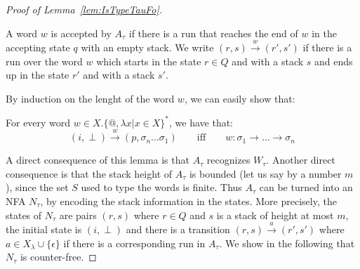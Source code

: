\begin{proof}[Proof of Lemma~\ref{lem:IsTypeTauFo}]
\begin{itemize}
\begin{center}
\end{center}
\end{itemize}
A word $w$ is accepted by $A_\tau$ if there is a run that reaches the end of $w$ in the accepting state $q$ with an empty stack. We write $(r, s)\xrightarrow{w} (r', s')$ if there is a run over the word $w$ which starts in the state $r\in Q$ and with a stack $s$ and ends up in the state $r'$ and with a stack $s'$.


By induction on the lenght of the word $w$, we can easily show that:
\begin{lemma}
For every word $w\in X.\{\text{@},\lambda x | x\in X \}^*$, we have that:
 $$(i, \perp)\xrightarrow{w} (p, \sigma_n\dots\sigma_1) \qquad\text{iff} \qquad 
w:\sigma_1\rightarrow\dots\rightarrow\sigma_n$$ 
\end{lemma}

A direct consequence of this lemma is that $A_\tau$ recognizes $W_\tau$. Another direct consequence is that the stack height of $A_\tau$ is bounded (let us say by a number $m$), since the set $S$ used to type the words is finite. Thus $A_\tau$ can be turned into an NFA $N_\tau$, by encoding the stack information in the states. More precisely, the states of $N_\tau$ are pairs $(r,s)$ where $r\in Q$ and $s$ is a stack of height at most $m$, the initial state is $(i,\perp)$ and there is a transition $(r,s)\xrightarrow{a}(r',s')$ where $a\in X_\lambda\cup\{\epsilon\}$ if there is a corresponding run in $A_\tau$. We show in the following that $N_\tau$ is counter-free. 


\end{proof}
